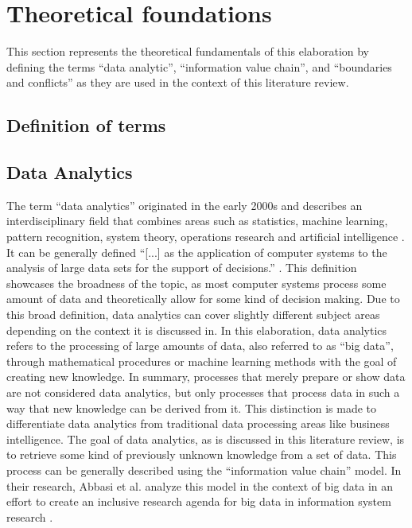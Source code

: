 \newpage\section{Theoretical foundations}

This section represents the theoretical fundamentals of this elaboration by defining the terms \enquote{data analytic}, \enquote{information value chain}, and \enquote{boundaries and conflicts} as they are used in the context of this literature review.

\subsection{Definition of terms}

\subsection{Data Analytics}

The term \enquote{data analytics} originated in the early 2000s and describes an interdisciplinary field that combines areas such as statistics, machine learning, pattern recognition, system theory, operations research and artificial intelligence \parencite{Runkler.2020}. It can be generally defined \enquote{[...] as the application of computer systems to the analysis of large data sets for the support of decisions.} \parencite{Runkler.2020}. This definition showcases the broadness of the topic, as most computer systems process some amount of data and theoretically allow for some kind of decision making. Due to this broad definition, data analytics can cover slightly different subject areas depending on the context it is discussed in. In this elaboration, data analytics refers to the processing of large amounts of data, also referred  to as \enquote{big data}, through mathematical procedures or machine learning methods with the goal of creating new knowledge. In summary, processes that merely prepare or show data are not considered data analytics, but only processes that process data in such a way that new knowledge can be derived from it. This distinction is made to differentiate data analytics from traditional data processing areas like business intelligence. The goal of data analytics, as is discussed in this literature review, is to retrieve some kind of previously unknown knowledge from a set of data. This process can be generally described using the \enquote{information value chain} model. In their research, Abbasi et al. analyze this model in the context of big data in an effort to create an inclusive research agenda for big data in information system research \parencite{Abbasi.2016}.

